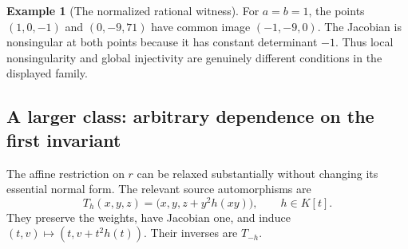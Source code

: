 \documentclass[11pt,a4paper]{article}
\numberwithin{equation}{section}
\theoremstyle{definition}
\newtheorem{example}[theorem]{Example}
\theoremstyle{remark}
\begin{document}
\begin{example}[The normalized rational witness]
For $a=b=1$, the points $(1,0,-1)$ and $(0,-9,71)$ have common image
$(-1,-9,0)$. The Jacobian is nonsingular at both points because it has
constant determinant $-1$. Thus local nonsingularity and global injectivity
are genuinely different conditions in the displayed family.
\end{example}

\subsection{A larger class: arbitrary dependence on the first invariant}
\label{wkr:sec:triangular}

The affine restriction on $r$ can be relaxed substantially without changing
its essential normal form. The relevant source automorphisms are
\begin{equation}\label{wkr:eq:source-shear}
T_h(x,y,z)=\bigl(x,y,z+y^2h(xy)\bigr),\qquad h\in K[t].
\end{equation}
They preserve the weights, have Jacobian one, and induce
$(t,v)\mapsto(t,v+t^2h(t))$. Their inverses are $T_{-h}$.
\end{document}
